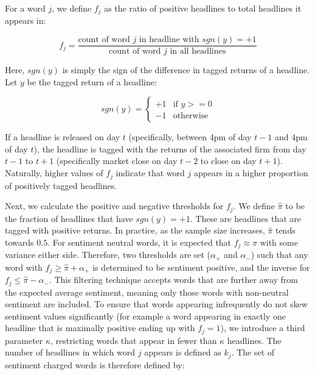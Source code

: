 For a word $j$, we define $f_j$ as the ratio of positive headlines to total headlines it appears in:

\begin{equation}
f_j = \frac{\text{count of word } j \text{ in headline with } sgn(y) = +1}{\text{count of word } j \text{ in all headlines}}
\end{equation}

\noindent
Here, $sgn(y)$ is simply the sign of the difference in tagged returns of a headline. Let $y$ be the tagged return of a headline:

\begin{equation}
sgn(y) = \left\{ \begin{matrix}
      +1 & \text{if } y >= 0 \\
      -1 & \text{otherwise}
\end{matrix} \right.
\end{equation}

\noindent
If a headline is released on day $t$ (specifically, between 4pm of day $t-1$ and 4pm of day $t$), the headline is tagged with the returns of the associated firm from day $t-1$ to $t+1$ (specifically market close on day $t-2$ to close on day $t+1$). Naturally, higher values of $f_j$ indicate that word $j$ appears in a higher proportion of positively tagged headlines.

Next, we calculate the positive and negative thresholds for $f_j$. We define $\hat \pi$ to be the fraction of headlines that have $sgn(y) = +1$. These are headlines that are tagged with positive returns. In practice, as the sample size increases, $\hat \pi$ tends towards $0.5$. For sentiment neutral words, it is expected that $f_j \approx \hat \pi$ with some variance either side. Therefore, two thresholds are set ($\alpha_+$ and $\alpha_-$) such that any word with $f_j \ge \hat \pi + \alpha_+$ is determined to be sentiment positive, and the inverse for $f_j \le \hat \pi - \alpha_-$. This filtering technique accepts words that are further away from the expected average sentiment, meaning only those words with non-neutral sentiment are included. To ensure that words appearing infrequently do not skew sentiment values significantly (for example a word appearing in exactly one headline that is maximally positive ending up with $f_j = 1$), we introduce a third parameter $\kappa$, restricting words that appear in fewer than $\kappa$ headlines. The number of headlines in which word $j$ appears is defined as $k_j$. The set of sentiment charged words is therefore defined by:

